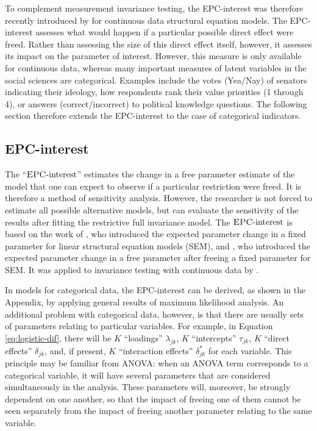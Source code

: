 \documentclass[letterpaper,12pt]{article}
\newcommand{\da}{\textrm{{\sc {EPC}}-interest}}
\begin{document}
To complement measurement invariance testing, the 
 EPC-interest was therefore recently introduced by \citet{Oberski:WP:EPC-interest} for continuous data structural equation models. The EPC-interest assesses what would happen if a particular possible direct effect were freed. Rather than assessing the size of this direct effect itself, however, it assesses its impact on the parameter of interest. However, this measure is only available for continuous data, whereas many important measures of latent variables in the social sciences are categorical. Examples include the votes (Yea/Nay) of senators indicating their ideology, how respondents rank their value priorities (1 through 4), or answers (correct/incorrect) to political knowledge questions. The following section therefore extends the EPC-interest to the case of categorical indicators.

\subsection{EPC-interest}
\label{sec:epc-interest}

The ``$\da$'' estimates the change in a free parameter estimate of the model that one can expect to observe if a particular restriction were freed. It is therefore a method of sensitivity analysis. However, the researcher is not forced to estimate all possible alternative models, but can evaluate the sensitivity of the results after fitting the restrictive full invariance model. 
The $\da{}$ is based on the work of \citet{saris_detection_1987}, who introduced the expected parameter change in a fixed parameter for linear structural equation models (SEM), and \citet{bentler1993some}, who introduced the expected parameter change in a free parameter after freeing a fixed parameter for SEM. It was applied to invariance testing with continuous data by \citet{Oberski:WP:EPC-interest}.

In models for categorical data, the EPC-interest can be derived, as shown in the Appendix, by applying general results of maximum likelihood analysis. An additional problem with categorical data, however, is that there are usually sets of parameters relating to particular variables. For example, in Equation \ref{eq:logistic-dif}, there will be $K$ ``loadings'' $\lambda_{jk}$, $K$ ``intercepts'' $\tau_{jk}$,  $K$ ``direct effects'' $\delta_{jk}$, and, if present, $K$ ``interaction effects'' $\delta^*_{jk}$ for each variable. This principle may be familiar from ANOVA: when an ANOVA term corresponds to a categorical variable, it will have several parameters that are considered simultaneously in the analysis. These parameters will, moreover, be strongly dependent on one another, so that the impact of freeing one of them cannot be seen separately from the impact of freeing another parameter relating to the same variable. 
\end{document}
